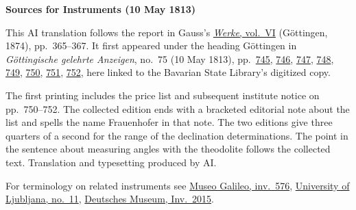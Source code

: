 \clearpage\thispagestyle{empty}
\begin{center}\textbf{Sources for Instruments (10 May 1813)}\end{center}
\noindent This AI translation follows the report in Gauss’s \href{https://gdz.sub.uni-goettingen.de/id/PPN236007467}{\textit{Werke}, vol.~VI} (Göttingen, 1874), pp.~365--367. It first appeared under the heading Göttingen in \textit{Göttingische gelehrte Anzeigen}, no.~75 (10 May 1813), pp.~\href{https://api.digitale-sammlungen.de/iiif/image/v2/bsb10538683_00757/full/1600,/0/default.jpg}{745}, \href{https://api.digitale-sammlungen.de/iiif/image/v2/bsb10538683_00758/full/1600,/0/default.jpg}{746}, \href{https://api.digitale-sammlungen.de/iiif/image/v2/bsb10538683_00759/full/1600,/0/default.jpg}{747}, \href{https://api.digitale-sammlungen.de/iiif/image/v2/bsb10538683_00760/full/1600,/0/default.jpg}{748}, \href{https://api.digitale-sammlungen.de/iiif/image/v2/bsb10538683_00761/full/1600,/0/default.jpg}{749}, \href{https://api.digitale-sammlungen.de/iiif/image/v2/bsb10538683_00762/full/1600,/0/default.jpg}{750}, \href{https://api.digitale-sammlungen.de/iiif/image/v2/bsb10538683_00763/full/1600,/0/default.jpg}{751}, \href{https://api.digitale-sammlungen.de/iiif/image/v2/bsb10538683_00764/full/1600,/0/default.jpg}{752}, here linked to the Bavarian State Library’s digitized copy.
\par\smallskip\noindent The first printing includes the price list and subsequent institute notice on pp.~750--752. The collected edition ends with a bracketed editorial note about the list and spells the name Frauenhofer in that note. The two editions give three quarters of a second for the range of the declination determinations. The point in the sentence about measuring angles with the theodolite follows the collected text. Translation and typesetting produced by AI.
\par\smallskip\noindent For terminology on related instruments see \href{https://catalogue.museogalileo.it/object/RepeatingCircle.html}{Museo Galileo, inv.~576}, \href{https://zbirka.fgg.uni-lj.si/en/instrument/11}{University of Ljubljana, no.~11}, \href{https://digital.deutsches-museum.de/projekte/gruendungssammlung/detail/2015/}{Deutsches Museum, Inv.~2015}.
\clearpage
